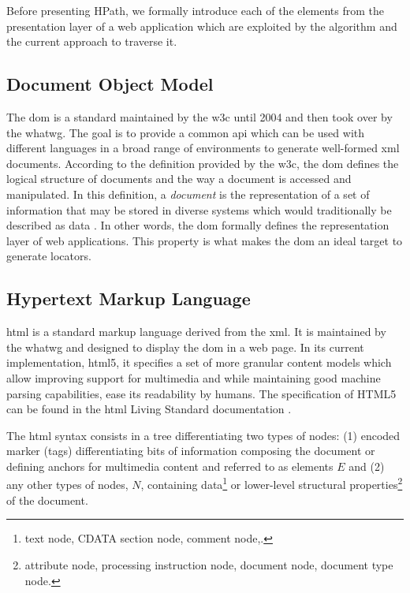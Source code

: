 Before presenting HPath, we formally introduce each of the elements from the presentation layer of a web application which are exploited by the algorithm and the current approach to traverse it.

\subsection{Document Object Model}
\label{sec:hpath-introduction-DOM}

The \gls{dom} is a standard maintained by the \gls{w3c} until 2004 and then took over by the \gls{whatwg}. The goal is to provide a common \gls{api} which can be used with different languages in a broad range of environments to generate well-formed \gls{xml} documents. According to the definition provided by the \gls{w3c}, the \gls{dom} defines the logical structure of documents and the way a document is accessed and manipulated. In this definition, a \emph{document} is the representation of a set of information that may be stored in diverse systems which would traditionally be described as data \cite{W3C2004}. In other words, the \gls{dom} formally defines the representation layer of web applications. This property is what makes the \gls{dom} an ideal target to generate locators.

\subsection{Hypertext Markup Language}
\label{sec:hpath-introduction-HTML}

\gls{html} is a standard markup language derived from the \gls{xml}. It is maintained by the \gls{whatwg} and designed to display the \gls{dom} in a web page. In its current implementation, \gls{html}5, it specifies a set of more granular content models which allow improving support for multimedia and while maintaining good machine parsing capabilities, ease its readability by humans. The specification of HTML5 can be found in the \gls{html} Living Standard documentation \cite{WHATWG2021}. 

The \gls{html} syntax consists in a tree differentiating two types of nodes: (1) encoded marker (tags) differentiating bits of information composing the document or defining anchors for multimedia content and referred to as elements $E$ and (2) any other types of nodes, $N$, containing data\footnote{text node, CDATA section node, comment node,.} or lower-level structural properties\footnote{attribute node, processing instruction node, document node, document type node.} of the document.

